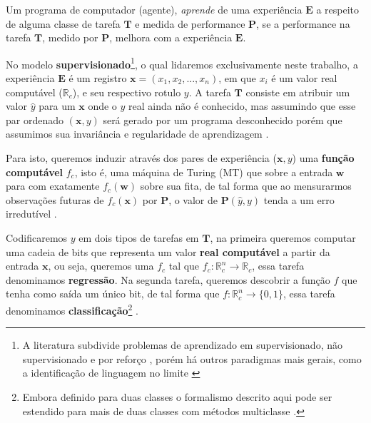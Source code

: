 \begin{definition}
Um programa de computador (agente), \textit{aprende} de uma experiência $\boldsymbol E$ a respeito de alguma classe de tarefa $\boldsymbol T$ e medida de performance $\boldsymbol P$, se a performance na tarefa $\boldsymbol T$, medido por $\boldsymbol P$, melhora com a experiência $\boldsymbol E$.
\end{definition}

No modelo \textbf{supervisionado}\footnote{A literatura subdivide problemas de aprendizado em supervisionado, não supervisionado e por reforço \cite{mohri2018foundations,russell2016artificial,friedman2001elements,goodfellow2016deep}, porém há outros paradigmas mais gerais, como a identificação de linguagem no limite \cite{gold1967language}}, o qual lidaremos exclusivamente neste trabalho, a experiência $\boldsymbol E$ é um registro $\boldsymbol{x}=(x_1,x_2,...,x_n)$, em que $x_i$ é um valor real computável ($\mathbb{R}_c$), e seu respectivo rotulo $y$. A tarefa $\boldsymbol T$ consiste em atribuir um valor $\hat{y}$ para um $\boldsymbol{x}$ onde o $y$ real ainda não é conhecido, mas assumindo que esse par ordenado $(\boldsymbol{x},y)$ será gerado por um programa desconhecido porém que assumimos sua invariância e regularidade de aprendizagem  \cite{mohri2018foundations,valiant1984theory}.

Para isto, queremos induzir através dos pares de experiência ($\boldsymbol{x},y$) uma \textbf{função computável} $f_c$, isto é, uma máquina de Turing (MT) que sobre a entrada $\boldsymbol{w}$ para com exatamente $f_c(\boldsymbol{w})$ sobre sua fita, de tal forma que ao mensurarmos observações futuras de $f_c(\boldsymbol{x})$ por $\boldsymbol P$, o valor de  $\boldsymbol{P}(\hat{y},y)$ tenda a um erro irredutível \cite{mohri2018foundations,mitchell1997machine,friedman2001elements}.

Codificaremos $y$ em dois tipos de tarefas em $\boldsymbol{T}$, na primeira queremos computar uma cadeia de bits que representa um valor \textbf{real computável} a partir da entrada $\boldsymbol{x}$, ou seja, queremos uma $f_c$ tal que $f_c:\mathbb{R}_c^n\longrightarrow \mathbb{R}_c$, essa tarefa denominamos \textbf{regressão}. Na segunda tarefa, queremos descobrir a função $f$ que tenha como saída um único bit, de tal forma que $f:\mathbb{R}_c^n\longrightarrow \{0,1\}$, essa tarefa denominamos \textbf{classificação}\footnote{Embora definido para duas classes o formalismo descrito aqui pode ser estendido para mais de duas classes com métodos multiclasse \cite{abu2012learning}.} \cite{goodfellow2016deep, mohri2018foundations}.

